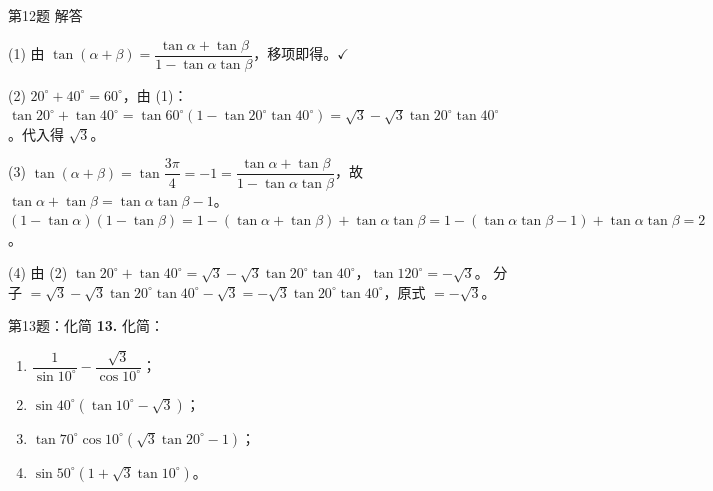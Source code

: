 \documentclass[10pt,aspectratio=169,serif]{beamer}
\begin{document}
\begin{frame}[t]{第12题 解答}
\begin{tcolorbox}[colback=orange!10,colframe=orange,title=\textbf{解}]
(1) 由 $\tan(\alpha+\beta)=\dfrac{\tan\alpha+\tan\beta}{1-\tan\alpha\tan\beta}$，移项即得。$\checkmark$

(2) $20^\circ+40^\circ=60^\circ$，由 (1)：$\tan20^\circ+\tan40^\circ=\tan60^\circ(1-\tan20^\circ\tan40^\circ)=\sqrt3-\sqrt3\tan20^\circ\tan40^\circ$。代入得 $\sqrt3$。

(3) $\tan(\alpha+\beta)=\tan\dfrac{3\pi}{4}=-1=\dfrac{\tan\alpha+\tan\beta}{1-\tan\alpha\tan\beta}$，故 $\tan\alpha+\tan\beta=\tan\alpha\tan\beta-1$。
$(1-\tan\alpha)(1-\tan\beta)=1-(\tan\alpha+\tan\beta)+\tan\alpha\tan\beta=1-(\tan\alpha\tan\beta-1)+\tan\alpha\tan\beta=2$。

(4) 由 (2) $\tan20^\circ+\tan40^\circ=\sqrt3-\sqrt3\tan20^\circ\tan40^\circ$，$\tan120^\circ=-\sqrt3$。
分子 $=\sqrt3-\sqrt3\tan20^\circ\tan40^\circ-\sqrt3=-\sqrt3\tan20^\circ\tan40^\circ$，原式 $=-\sqrt3$。
\end{tcolorbox}
\end{frame}

\begin{frame}[t]{第13题：化简}
\textbf{13.} 化简：
\begin{enumerate}
  \item $\dfrac{1}{\sin 10^\circ}-\dfrac{\sqrt3}{\cos 10^\circ}$；
  \item $\sin 40^\circ(\tan 10^\circ-\sqrt3)$；
  \item $\tan 70^\circ\cos 10^\circ(\sqrt3\tan 20^\circ-1)$；
  \item $\sin 50^\circ(1+\sqrt3\tan 10^\circ)$。
\end{enumerate}
\end{frame}
\end{document}
